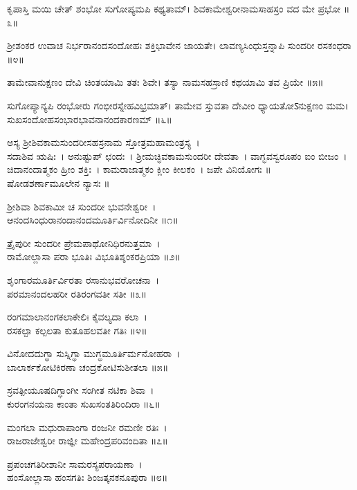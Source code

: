ಕೃಪಾಸ್ತಿ ಮಯಿ ಚೇತ್ ಶಂಭೋ ಸುಗೋಪ್ಯಮಪಿ ಕಥ್ಯತಾಮ್।
ಶಿವಕಾಮೇಶ್ವರೀನಾಮಸಾಹಸ್ರಂ ವದ ಮೇ ಪ್ರಭೋ ॥೩॥

ಶ್ರೀಶಂಕರ ಉವಾಚ
ನಿರ್ಭರಾನಂದಸಂದೋಹಃ ಶಕ್ತಿಭಾವೇನ ಜಾಯತೇ।
ಲಾವಣ್ಯಸಿಂಧುಸ್ತನ್ನಾಪಿ ಸುಂದರೀ ರಸಕಂಧರಾ ॥೪॥

ತಾಮೇವಾನುಕ್ಷಣಂ ದೇವಿ ಚಿಂತಯಾಮಿ ತತಃ ಶಿವೇ।
ತಸ್ಯಾ ನಾಮಸಹಸ್ರಾಣಿ ಕಥಯಾಮಿ ತವ ಪ್ರಿಯೇ ॥೫॥

ಸುಗೋಪ್ಯಾನ್ಯಪಿ ರಂಭೋರು ಗಂಭೀರಸ್ನೇಹವಿಭ್ರಮಾತ್।
ತಾಮೇವ ಸ್ತುವತಾ ದೇವೀಂ ಧ್ಯಾಯತೋऽನುಕ್ಷಣಂ ಮಮ।
ಸುಖಸಂದೋಹಸಂಭಾರಭಾವನಾನಂದಕಾರಣಮ್ ॥೬॥

ಅಸ್ಯ ಶ್ರೀಶಿವಕಾಮಸುಂದರೀಸಹಸ್ರನಾಮ ಸ್ತೋತ್ರಮಹಾಮಂತ್ರಸ್ಯ~।\\
ಸದಾಶಿವ ಋಷಿಃ~। ಅನುಷ್ಟುಪ್ ಛಂದಃ~। ಶ್ರೀಮಚ್ಛಿವಕಾಮಸುಂದರೀ ದೇವತಾ~। ವಾಗ್ಭವಸ್ವರೂಪಂ ಐಂ ಬೀಜಂ~। ಚಿದಾನಂದಾತ್ಮಕಂ ಹ್ರೀಂ ಶಕ್ತಿಃ~। ಕಾಮರಾಜಾತ್ಮಕಂ ಕ್ಲೀಂ ಕೀಲಕಂ~। ಜಪೇ ವಿನಿಯೋಗಃ ॥\\
ಷೋಡಶರ್ಣಾಮೂಲೇನ ನ್ಯಾಸಃ ॥


	ಶ್ರೀಶಿವಾ ಶಿವಕಾಮೀ ಚ ಸುಂದರೀ ಭುವನೇಶ್ವರೀ~।\\
	ಆನಂದಸಿಂಧುರಾನಂದಾನಂದಮೂರ್ತಿರ್ವಿನೋದಿನೀ ॥೧॥

ತ್ರೈಪುರೀ ಸುಂದರೀ ಪ್ರೇಮಪಾಥೋನಿಧಿರನುತ್ತಮಾ~।\\
ರಾಮೋಲ್ಲಾಸಾ ಪರಾ ಭೂತಿಃ ವಿಭೂತಿಶ್ಶಂಕರಪ್ರಿಯಾ ॥೨॥

	ಶೃಂಗಾರಮೂರ್ತಿರ್ವಿರತಾ ರಸಾನುಭವರೋಚನಾ~।\\
	ಪರಮಾನಂದಲಹರೀ ರತಿರಂಗವತೀ ಸತೀ ॥೩॥

ರಂಗಮಾಲಾನಂಗಕಲಾಕೇಲಿಃ ಕೈವಲ್ಯದಾ ಕಲಾ~।\\
ರಸಕಲ್ಪಾ ಕಲ್ಪಲತಾ ಕುತೂಹಲವತೀ ಗತಿಃ ॥೪॥

	ವಿನೋದದುಗ್ಧಾ ಸುಸ್ನಿಗ್ಧಾ ಮುಗ್ಧಮೂರ್ತಿರ್ಮನೋಹರಾ~।\\
	ಬಾಲಾರ್ಕಕೋಟಿಕಿರಣಾ ಚಂದ್ರಕೋಟಿಸುಶೀತಲಾ ॥೫॥

ಸ್ರವತ್ಪೀಯೂಷದಿಗ್ಧಾಂಗೀ ಸಂಗೀತ ನಟಿಕಾ ಶಿವಾ~।\\
ಕುರಂಗನಯನಾ ಕಾಂತಾ ಸುಖಸಂತತಿರಿಂದಿರಾ ॥೬॥

	ಮಂಗಲಾ ಮಧುರಾಪಾಂಗಾ ರಂಜನೀ ರಮಣೀ ರತಿಃ~।\\
	ರಾಜರಾಜೇಶ್ವರೀ ರಾಜ್ಞೀ ಮಹೇಂದ್ರಪರಿವಂದಿತಾ ॥೭॥

ಪ್ರಪಂಚಗತಿರೀಶಾನೀ ಸಾಮರಸ್ಯಪರಾಯಣಾ~।\\
ಹಂಸೋಲ್ಲಾಸಾ ಹಂಸಗತಿಃ ಶಿಂಜತ್ಕನಕನೂಪುರಾ ॥೮॥


